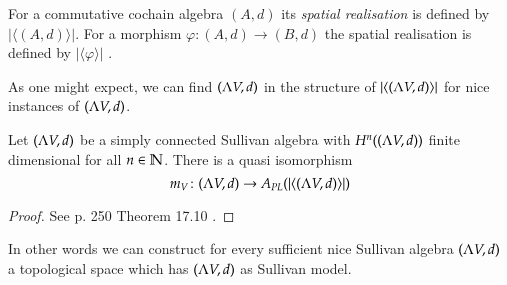  \begin{Definition}
  For a commutative cochain algebra $(A,d)$ its \emph{spatial realisation} is defined by $| \langle (A,d) \rangle |$. For
  a morphism $\varphi \colon (A,d) \to (B,d)$ the spatial realisation is defined by $|\langle \varphi \rangle|$ .
 \end{Definition}

 As one might expect, we can find $(\Lambda V,d)$ in the structure of  $| \langle (\Lambda V,d) \rangle |$ for nice 
 instances of $(\Lambda V,d)$.
 
 \begin{Theorem}
  Let $(\Lambda V,d)$ be a simply connected Sullivan algebra with $H^n((\Lambda V,d))$ finite dimensional for all $n \in \mathbb{N}$.
  There is a quasi isomorphism
  $$m_V \colon (\Lambda V,d) \to A_{PL}(| \langle (\Lambda V,d) \rangle |)$$
 \end{Theorem}

 \begin{proof}
 See \cite{Felix2001} p. 250 Theorem 17.10 .
  
 \end{proof}
 
 In other words we can construct for every sufficient nice Sullivan algebra $(\Lambda V,d)$ 
  a topological space which has $(\Lambda V,d)$ as  Sullivan model.
 